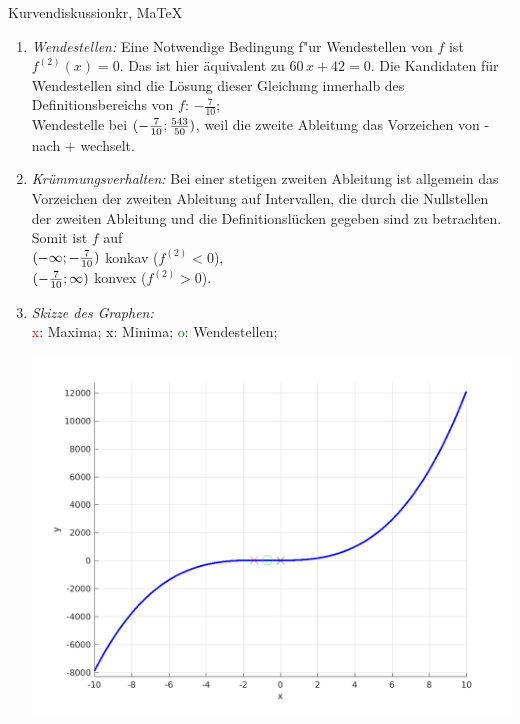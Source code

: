 \begin{MAufgabe}{Kurvendiskussion}{kr, MaTeX}
\begin{enumerate}
 $\MoIl-\infty\MIntvlSep- \frac{7}{5}\MoIr$ monoton wachsend, \\ 
 $\MoIl- \frac{7}{5}\MIntvlSep0\MoIr$ monoton  fallend, \\ 
 $\MoIl0\MIntvlSep \infty\MoIr$ monoton wachsend. \\ 
 \item \emph{Wendestellen:} 
 Eine Notwendige Bedingung f"ur Wendestellen von $f$ ist $f^{(2)}(x)=0$. 
 Das ist hier \"aquivalent zu $60\, x + 42=0$. 
 Die Kandidaten f\"ur Wendestellen sind die L\"osung dieser Gleichung innerhalb des Definitionsbereichs von $f$: $- \frac{7}{10}$; \\ 
 Wendestelle bei $(- \frac{7}{10};\frac{543}{50})$, weil die zweite Ableitung das Vorzeichen von - nach + wechselt. \\ 
 \item \emph{Kr\"ummungsverhalten:} 
 Bei einer stetigen zweiten Ableitung ist allgemein das Vorzeichen der zweiten Ableitung auf Intervallen, die durch die Nullstellen der zweiten Ableitung und die Definitionsl\"ucken gegeben sind zu betrachten. 
 Somit ist $f$ auf \\ 
 $(-\infty ;- \frac{7}{10})$  konkav ($f^{(2)}<0$), \\ 
 $(- \frac{7}{10}; \infty)$  konvex ($f^{(2)}>0$). \\ 
 \item \emph{Skizze des Graphen:} \\ 
 {\textcolor{red} x}: Maxima; {\textcolor{black} x}: Minima; {\textcolor{green} o}: Wendestellen; 
  \begin{center}
  \includegraphics[width=0.8\linewidth]{Abb_zur_Ag_autogenerated_fractions_12.png} \end{center}
  
 \end{enumerate}
 \else\relax\fi
  \end{MAufgabe}